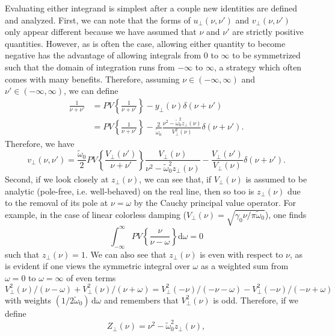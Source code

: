 \documentclass{article}
\begin{document}
Evaluating either integrand is simplest after a couple new identities are defined and analyzed. First, we can note that the forms of $u_\perp(\nu,\nu')$ and $v_\perp(\nu,\nu')$ only appear different because we have assumed that $\nu$ and $\nu'$ are strictly positive quantities. However, as is often the case, allowing either quantity to become negative has the advantage of allowing integrals from 0 to $\infty$ to be symmetrized such that the domain of integration runs from $-\infty$ to $\infty$, a strategy which often comes with many benefits. Therefore, assuming $\nu\in(-\infty,\infty)$ and $\nu'\in(-\infty,\infty)$, we can define
\begin{equation}
\begin{split}
\frac{1}{\nu + \nu'} &= PV\left\{\frac{1}{\nu + \nu'}\right\} - y_\perp(\nu)\delta(\nu + \nu')\\
&= PV\left\{\frac{1}{\nu + \nu'}\right\} - \frac{2}{\tilde{\omega}_0}\frac{\nu^2 - \tilde{\omega}_0^2z_\perp(\nu)}{V_\perp^2(\nu)}\delta(\nu + \nu').
\end{split}
\end{equation}
Therefore, we have
\begin{equation}
v_\perp(\nu,\nu') = \frac{\tilde{\omega}_0}{2}PV\left\{\frac{V_\perp(\nu')}{\nu + \nu'}\right\}\frac{V_\perp(\nu)}{\nu^2 - \tilde{\omega}_0^2z_\perp(\nu)} - \frac{V_\perp(\nu')}{V_\perp(\nu)}\delta(\nu + \nu').
\end{equation}
Second, if we look closely at $z_\perp(\nu)$, we can see that, if $V_\perp(\nu)$ is assumed to be analytic (pole-free, i.e. well-behaved) on the real line, then so too is $z_\perp(\nu)$ due to the removal of its pole at $\nu = \omega$ by the Cauchy principal value operator. For example, in the case of linear colorless damping ($V_\perp(\nu) = \sqrt{\gamma_0\nu/\pi\tilde{\omega}_0}$), one finds 
\begin{equation}
\int_{-\infty}^\infty PV\left\{\frac{\nu}{\nu - \omega}\right\}\mathrm{d}\omega = 0
\end{equation}
such that $z_\perp(\nu) = 1$. We can also see that $z_\perp(\nu)$ is even with respect to $\nu$, as is evident if one views the symmetric integral over $\omega$ as a weighted sum from $\omega = 0$ to $\omega = \infty$ of even terms $V_\perp^2(\nu)/(\nu-\omega) + V_\perp^2(\nu)/(\nu + \omega) = V_\perp^2(-\nu)/(-\nu-\omega) - V_\perp^2(-\nu)/(-\nu + \omega)$ with weights $(1/2\tilde{\omega}_0)\,\mathrm{d}\omega$ and remembers that $V_\perp^2(\nu)$ is odd. Therefore, if we define
\begin{equation}
Z_\perp(\nu) = \nu^2 - \tilde{\omega}_0^2z_\perp(\nu),
\end{equation}
\end{document}
